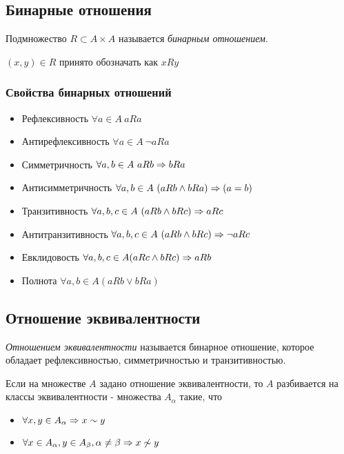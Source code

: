 \subsection{Бинарные отношения}

\begin{definition}
	Подмножество $R \subset A \times A$ называется \textit{бинарным отношением}.
	
	$(x, y) \in R$ принято обозначать как $xRy$
\end{definition}

\subsubsection*{Свойства бинарных отношений}

\begin{itemize}
	\item Рефлексивность $\forall a \in A\ aRa$
	\item Антирефлексивность $\forall a \in A\ \neg aRa$
	\item Симметричность $\forall a, b \in A\ aRb \Rightarrow bRa$
	\item Антисимметричность $\forall a, b \in A\ (aRb \wedge bRa) \Ra (a = b)$
	\item Транзитивность $\forall a, b, c \in A\ (aRb \wedge bRc) \Ra aRc$
	\item Антитранзитивность $\forall a, b, c \in A\ (aRb \wedge bRc) \Rightarrow \neg aRc$
	\item Евклидовость $\forall a, b, c \in A (aRc \wedge bRc) \Rightarrow aRb$
	\item Полнота $\forall a, b \in A (aRb \vee bRa)$
\end{itemize}

\subsection{Отношение эквивалентности}

\begin{definition}
	\textit{Отношением эквивалентности} называется бинарное отношение, которое обладает рефлексивностью, симметричностью и транзитивностью.
\end{definition}

\begin{theorem}
	Если на множестве $A$ задано отношение эквивалентности, то $A$ разбивается на классы эквивалентности - множества $A_{\alpha}$ такие, что
	\begin{itemize}
		\item $\forall x, y \in A_{\alpha} \Rightarrow x \sim y$
		\item $\forall x \in A_{\alpha}, y \in A_{\beta}, \alpha \neq \beta \Rightarrow x \not\sim y$
	\end{itemize}
\end{theorem}

